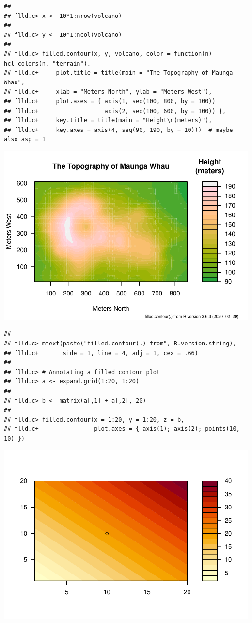 \documentclass[
]{book}
\begin{document}
\begin{verbatim}
## 
## flld.c> x <- 10*1:nrow(volcano)
## 
## flld.c> y <- 10*1:ncol(volcano)
## 
## flld.c> filled.contour(x, y, volcano, color = function(n) hcl.colors(n, "terrain"),
## flld.c+     plot.title = title(main = "The Topography of Maunga Whau",
## flld.c+     xlab = "Meters North", ylab = "Meters West"),
## flld.c+     plot.axes = { axis(1, seq(100, 800, by = 100))
## flld.c+                   axis(2, seq(100, 600, by = 100)) },
## flld.c+     key.title = title(main = "Height\n(meters)"),
## flld.c+     key.axes = axis(4, seq(90, 190, by = 10)))  # maybe also asp = 1
\end{verbatim}

\includegraphics{TudodoR_files/figure-latex/unnamed-chunk-145-5.pdf}

\begin{verbatim}
## 
## flld.c> mtext(paste("filled.contour(.) from", R.version.string),
## flld.c+       side = 1, line = 4, adj = 1, cex = .66)
## 
## flld.c> # Annotating a filled contour plot
## flld.c> a <- expand.grid(1:20, 1:20)
## 
## flld.c> b <- matrix(a[,1] + a[,2], 20)
## 
## flld.c> filled.contour(x = 1:20, y = 1:20, z = b,
## flld.c+                plot.axes = { axis(1); axis(2); points(10, 10) })
\end{verbatim}

\includegraphics{TudodoR_files/figure-latex/unnamed-chunk-145-6.pdf}
\end{document}
